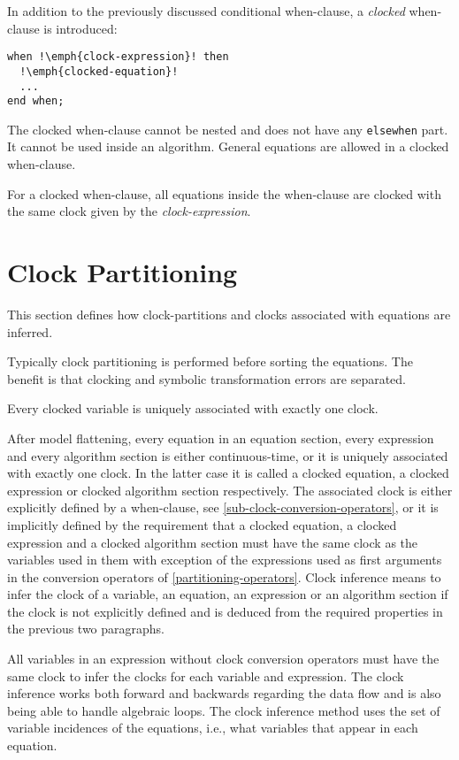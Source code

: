 In addition to the previously discussed conditional when-clause, a
\emph{clocked} when-clause is introduced:
\begin{lstlisting}[language=modelica,escapechar=!]
when !\emph{clock-expression}! then
  !\emph{clocked-equation}!
  ...
end when;
\end{lstlisting}

The clocked when-clause cannot be nested and does not have any \lstinline!elsewhen! part.  It cannot be used inside an algorithm.  General equations are allowed in a clocked when-clause.

For a clocked when-clause, all equations inside the when-clause are
clocked with the same clock given by the \emph{clock-expression}.

\section{Clock Partitioning}\label{clock-partitioning}

This section defines how clock-partitions and clocks associated with
equations are inferred.

\begin{nonnormative}
Typically clock partitioning is performed before sorting the equations.  The benefit is that clocking and symbolic transformation errors are separated.
\end{nonnormative}

Every clocked variable is uniquely associated with exactly one clock.

After model flattening, every equation in an equation section, every
expression and every algorithm section is either continuous-time, or it
is uniquely associated with exactly one clock. In the latter case it is
called a clocked equation, a clocked expression or clocked algorithm
section respectively. The associated clock is either explicitly defined
by a when-clause, see \cref{sub-clock-conversion-operators}, or it is implicitly defined by the
requirement that a clocked equation, a clocked expression and a clocked
algorithm section must have the same clock as the variables used in them
with exception of the expressions used as first arguments in the
conversion operators of \cref{partitioning-operators}. Clock inference means to infer the
clock of a variable, an equation, an expression or an algorithm section
if the clock is not explicitly defined and is deduced from the required
properties in the previous two paragraphs.

All variables in an expression without clock conversion operators must
have the same clock to infer the clocks for each variable and
expression. The clock inference works both forward and backwards
regarding the data flow and is also being able to handle algebraic
loops. The clock inference method uses the set of variable incidences of
the equations, i.e., what variables that appear in each equation.

